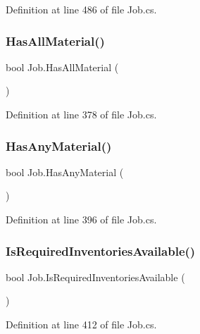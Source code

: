 Definition at line 486 of file Job.\+cs.

\mbox{\label{class_job_a1d272ad587bd70f2aeca6aba7ced837b}} 
\subsubsection{\texorpdfstring{Has\+All\+Material()}{HasAllMaterial()}}
{\footnotesize\ttfamily bool Job.\+Has\+All\+Material (\begin{DoxyParamCaption}{ }\end{DoxyParamCaption})}



Definition at line 378 of file Job.\+cs.

\mbox{\label{class_job_a5225110615c06f8fca994f884073fe90}} 
\subsubsection{\texorpdfstring{Has\+Any\+Material()}{HasAnyMaterial()}}
{\footnotesize\ttfamily bool Job.\+Has\+Any\+Material (\begin{DoxyParamCaption}{ }\end{DoxyParamCaption})}



Definition at line 396 of file Job.\+cs.

\mbox{\label{class_job_a6f863c4a232bab7636ac7e075a2736d1}} 
\subsubsection{\texorpdfstring{Is\+Required\+Inventories\+Available()}{IsRequiredInventoriesAvailable()}}
{\footnotesize\ttfamily bool Job.\+Is\+Required\+Inventories\+Available (\begin{DoxyParamCaption}{ }\end{DoxyParamCaption})}



Definition at line 412 of file Job.\+cs.

